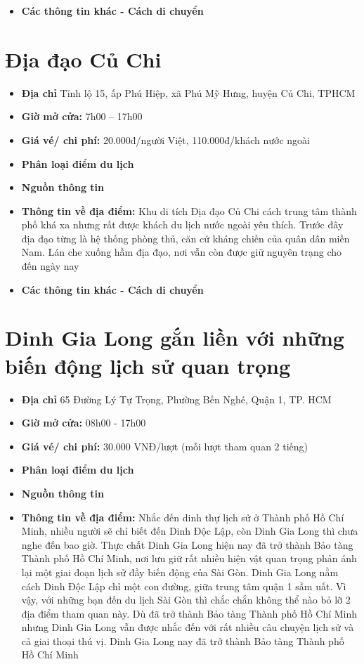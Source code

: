 \documentclass{article}
\begin{document}
\begin{itemize}
    \item{\textbf{Các thông tin khác - Cách di chuyển}}
\end{itemize}

\section{Địa đạo Củ Chi}
\begin{itemize}
    \item{\textbf{Địa chỉ}} Tỉnh lộ 15, ấp Phú Hiệp, xã Phú Mỹ Hưng, huyện Củ Chi, TPHCM
    \item{\textbf{Giờ mở cửa:}} 7h00 – 17h00
    \item{\textbf{Giá vé/ chi phí:}} 20.000đ/người Việt, 110.000đ/khách nước ngoài
    \item{\textbf{Phân loại điểm du lịch} }
    \item{\textbf{Nguồn thông tin}}
    \item{\textbf{Thông tin về địa điểm:}} Khu di tích Địa đạo Củ Chi cách trung tâm thành phố khá xa nhưng rất được khách du lịch nước ngoài yêu thích. Trước đây địa đạo từng là hệ thống phòng thủ, căn cứ kháng chiến của quân dân miền Nam. Lán che xuống hầm địa đạo, nơi vẫn còn được giữ nguyên trạng cho đến ngày nay
\end{itemize}

\begin{itemize}
    \item{\textbf{Các thông tin khác - Cách di chuyển}}
\end{itemize}

\section{Dinh Gia Long gắn liền với những biến động lịch sử quan trọng}
\begin{itemize}
    \item{\textbf{Địa chỉ}} 65 Đường Lý Tự Trọng, Phường Bến Nghé, Quận 1, TP. HCM
    \item{\textbf{Giờ mở cửa:}} 08h00 - 17h00
    \item{\textbf{Giá vé/ chi phí:}} 30.000 VNĐ/lượt (mỗi lượt tham quan 2 tiếng)
    \item{\textbf{Phân loại điểm du lịch} }
    \item{\textbf{Nguồn thông tin}}
    \item{\textbf{Thông tin về địa điểm:}} Nhắc đến dinh thự lịch sử ở Thành phố Hồ Chí Minh, nhiều người sẽ chỉ biết đến Dinh Độc Lập, còn Dinh Gia Long thì chưa nghe đến bao giờ. Thực chất Dinh Gia Long hiện nay đã trở thành Bảo tàng Thành phố Hồ Chí Minh, nơi lưu giữ rất nhiều hiện vật quan trọng phản ánh lại một giai đoạn lịch sử đầy biến động của Sài Gòn. Dinh Gia Long nằm cách Dinh Độc Lập chỉ một con đường, giữa trung tâm quận 1 sầm uất. Vì vậy, với những bạn đến du lịch Sài Gòn thì chắc chắn không thể nào bỏ lỡ 2 địa điểm tham quan này. Dù đã trở thành Bảo tàng Thành phố Hồ Chí Minh nhưng Dinh Gia Long vẫn được nhắc đến với rất nhiều câu chuyện lịch sử và cả giai thoại thú vị. Dinh Gia Long nay đã trở thành Bảo tàng Thành phố Hồ Chí Minh
\end{itemize}
\end{document}
